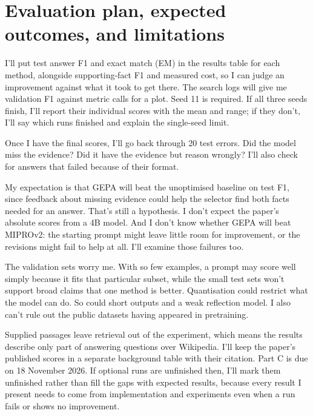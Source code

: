 \documentclass[11pt,a4paper]{article}
\begin{document}
{{{\section{Evaluation plan, expected outcomes, and limitations}
I'll put test answer F1 and exact match (EM) in the results table for each method, alongside supporting-fact F1 and measured cost, so I can judge an improvement against what it took to get there. The search logs will give me validation F1 against metric calls for a plot. Seed 11 is required. If all three seeds finish, I'll report their individual scores with the mean and range; if they don't, I'll say which runs finished and explain the single-seed limit.

Once I have the final scores, I'll go back through 20 test errors. Did the model miss the evidence? Did it have the evidence but reason wrongly? I'll also check for answers that failed because of their format.

My expectation is that GEPA will beat the unoptimised baseline on test F1, since feedback about missing evidence could help the selector find both facts needed for an answer. That's still a hypothesis. I don't expect the paper's absolute scores from a 4B model. And I don't know whether GEPA will beat MIPROv2: the starting prompt might leave little room for improvement, or the revisions might fail to help at all. I'll examine those failures too.

The validation sets worry me. With so few examples, a prompt may score well simply because it fits that particular subset, while the small test sets won't support broad claims that one method is better. Quantisation could restrict what the model can do. So could short outputs and a weak reflection model. I also can't rule out the public datasets having appeared in pretraining.

Supplied passages leave retrieval out of the experiment, which means the results describe only part of answering questions over Wikipedia. I'll keep the paper's published scores in a separate background table with their citation. Part C is due on 18 November 2026. If optional runs are unfinished then, I'll mark them unfinished rather than fill the gaps with expected results, because every result I present needs to come from implementation and experiments even when a run fails or shows no improvement.

\newpage
}}}
\end{document}
